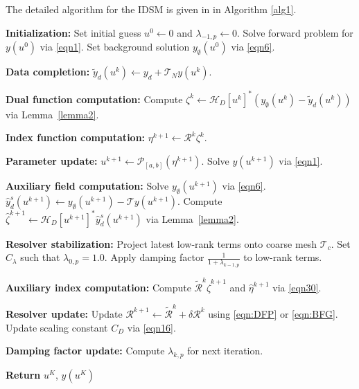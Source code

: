 \documentclass[onefignum,onetabnum]{siamart190516}
\numberwithin{equation}{section}
\begin{document}
The detailed algorithm for the IDSM is given in in Algorithm \ref{alg1}.

\begin{algorithm}[hbt!]
\caption{IDSM for Elliptic Inverse Problems with Partial Cauchy Data}
\label{alg1}
\begin{algorithmic}[1]

\State \textbf{Initialization:}
\State Set initial guess $u^0 \gets 0$ and $\lambda_{-1,p} \gets 0$.
\State Solve forward problem for $y(u^0)$ via \eqref{eqn1}.
\State Set background solution $y_\emptyset(u^0)$ via \eqref{eqn6}.

\State \textbf{Data completion:}
\State $\tilde{y}_d(u^k) \gets y_d + \mathcal{T}_N y(u^k)$.

\State \textbf{Dual function computation:}
\State Compute $\zeta^k \gets \mathcal{H}_D[u^k]^* (y_\emptyset(u^k)-\tilde{y}_d(u^k))$ via Lemma~\ref{lemma2}.

\State \textbf{Index function computation:}
\State $\eta^{k+1} \gets \mathcal{R}^k \zeta^k$.

\State \textbf{Parameter update:}
\State $u^{k+1} \gets \mathcal{P}_{[a,b]}(\eta^{k+1})$.
\State Solve $y(u^{k+1})$ via \eqref{eqn1}.

\State \textbf{Auxiliary field computation:}
\State Solve $y_\emptyset(u^{k+1})$ via \eqref{eqn6}. 
\State $\hat{y}^s_d(u^{k+1}) \gets y_\emptyset(u^{k+1}) - \mathcal{T} y(u^{k+1})$.
\State Compute $\hat{\zeta}^{k+1} \gets \mathcal{H}_D[u^{k+1}]^* \hat{y}^s_d(u^{k+1})$ via Lemma~\ref{lemma2}.

\State \textbf{Resolver stabilization:}
\State Project latest low-rank terms onto coarse mesh $\mathscr{T}_c$.
\State Set $C_{\lambda}$ such that $\lambda_{0,p}=1.0$.
\EndIf
\State Apply damping factor $\frac{1}{1+\lambda_{k-1,p}}$ to low-rank terms.

\State \textbf{Auxiliary index computation:}
\State Compute $\widetilde{\mathcal{R}}^k \hat{\zeta}^{k+1}$ and $\hat{\eta}^{k+1}$ via \eqref{eqn30}.

\State \textbf{Resolver update:}
\State Update $\mathcal{R}^{k+1} \gets \widetilde{\mathcal{R}}^k + \delta \mathcal{R}^{k}$ using \eqref{eqn:DFP} or \eqref{eqn:BFG}.
\State Update scaling constant $C_D$ via \eqref{eqn16}.

\State \textbf{Damping factor update:}
\State Compute $\lambda_{k,p}$ for next iteration.
\EndIf
\EndFor

\State \textbf{Return} $u^K$, $y(u^K)$
\end{algorithmic}
\end{algorithm}
\end{document}
